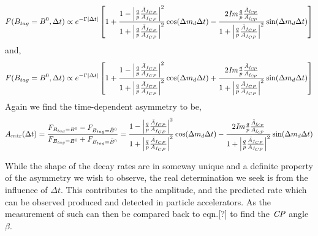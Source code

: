 \documentclass[floatfix,aps,prd,amsmath,amssymb]{revtex4}
\begin{document}
\[F(B_{tag}=B^{0},\Delta t) \propto
 e^{-\Gamma |\Delta t|}
\left[1+\frac{1-\left|\frac{q}{p}\frac{\bar{A}_{f_{CP}}}{A_{f_{CP}}}
\right|^{2}}{1+\left|\frac{q}{p}\frac{\bar{A}_{f_{CP}}}{A_{f_{CP}}}\right|^{2}}\cos(\Delta m_{d}\Delta t) - 
\frac{2\it{I}m\frac{q}{p}\frac{\bar{A}_{f_{CP}}}{A_{f_{CP}}}}
{1+\left|\frac{q}{p}\frac{\bar{A}_{f_{CP}}}{A_{f_{CP}}}
\right|^{2}}
\sin(\Delta m_{d} \Delta t)\right]\]
and,
\[F(B_{tag}=B^{0},\Delta t) \propto
 e^{-\Gamma |\Delta t|}
\left[1+\frac{1-\left|\frac{q}{p}\frac{\bar{A}_{f_{CP}}}{A_{f_{CP}}}
\right|^{2}}{1+\left|\frac{q}{p}\frac{\bar{A}_{f_{CP}}}{A_{f_{CP}}}\right|^{2}}\cos(\Delta m_{d}\Delta t) + 
\frac{2\it{I}m\frac{q}{p}\frac{\bar{A}_{f_{CP}}}{A_{f_{CP}}}}
{1+\left|\frac{q}{p}\frac{\bar{A}_{f_{CP}}}{A_{f_{CP}}}
\right|^{2}}
\sin(\Delta m_{d} \Delta t)\right]\]
Again we find the time-dependent asymmetry to be,
\[A_{mix}(\Delta t) = \frac{F_{B_{tag}=B^0}-F_{B_{tag}=\bar{B}^0}}{F_{B_{tag}=B^0}+F_{B_{tag}=\bar{B}^0}} = \frac{1-\left|\frac{q}{p}\frac{\bar{A}_{f_{CP}}}{A_{f_{CP}}}
\right|^{2}}{1+\left|\frac{q}{p}\frac{\bar{A}_{f_{CP}}}{A_{f_{CP}}}\right|^{2}}\cos(\Delta m_{d}\Delta t) - 
\frac{2\it{I}m\frac{q}{p}\frac{\bar{A}_{f_{CP}}}{A_{f_{CP}}}}
{1+\left|\frac{q}{p}\frac{\bar{A}_{f_{CP}}}{A_{f_{CP}}}
\right|^{2}}
\sin(\Delta m_{d} \Delta t)\]

While the shape of the decay rates are in someway unique and a definite property of the asymmetry we wish to observe, the real determination we seek is from the influence of $\Delta t$. This contributes to the amplitude, and the predicted rate which can be observed produced and detected in particle accelerators. As the measurement of such can then be compared back to eqn.[?] to find the $\it{CP}$ angle $\beta$.


\end{document}
